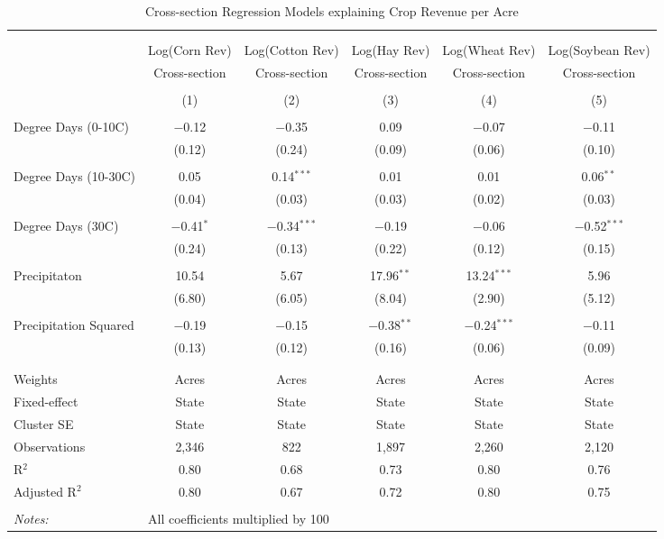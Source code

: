 \documentclass[10pt]{article}
\begin{document}
\begin{table}[!htbp] \centering 
  \caption{Cross-section Regression Models explaining Crop Revenue per Acre} 
  \label{} 
\footnotesize 
\begin{tabular}{@{\extracolsep{5pt}}lccccc} 
\\[-1.8ex]\hline 
\hline \\[-1.8ex] 
\\[-1.8ex] & Log(Corn Rev) & Log(Cotton Rev) & Log(Hay Rev) & Log(Wheat Rev) & Log(Soybean Rev) \\ 
 & Cross-section & Cross-section & Cross-section & Cross-section & Cross-section \\ 
\\[-1.8ex] & (1) & (2) & (3) & (4) & (5)\\ 
\hline \\[-1.8ex] 
 Degree Days (0-10C) & $-$0.12 & $-$0.35 & 0.09 & $-$0.07 & $-$0.11 \\ 
  & (0.12) & (0.24) & (0.09) & (0.06) & (0.10) \\ 
  & & & & & \\ 
 Degree Days (10-30C) & 0.05 & 0.14$^{***}$ & 0.01 & 0.01 & 0.06$^{**}$ \\ 
  & (0.04) & (0.03) & (0.03) & (0.02) & (0.03) \\ 
  & & & & & \\ 
 Degree Days (30C) & $-$0.41$^{*}$ & $-$0.34$^{***}$ & $-$0.19 & $-$0.06 & $-$0.52$^{***}$ \\ 
  & (0.24) & (0.13) & (0.22) & (0.12) & (0.15) \\ 
  & & & & & \\ 
 Precipitaton & 10.54 & 5.67 & 17.96$^{**}$ & 13.24$^{***}$ & 5.96 \\ 
  & (6.80) & (6.05) & (8.04) & (2.90) & (5.12) \\ 
  & & & & & \\ 
 Precipitation Squared & $-$0.19 & $-$0.15 & $-$0.38$^{**}$ & $-$0.24$^{***}$ & $-$0.11 \\ 
  & (0.13) & (0.12) & (0.16) & (0.06) & (0.09) \\ 
  & & & & & \\ 
\hline \\[-1.8ex] 
Weights & Acres & Acres & Acres & Acres & Acres \\ 
Fixed-effect & State & State & State & State & State \\ 
Cluster SE & State & State & State & State & State \\ 
Observations & 2,346 & 822 & 1,897 & 2,260 & 2,120 \\ 
R$^{2}$ & 0.80 & 0.68 & 0.73 & 0.80 & 0.76 \\ 
Adjusted R$^{2}$ & 0.80 & 0.67 & 0.72 & 0.80 & 0.75 \\ 
\hline 
\hline \\[-1.8ex] 
\textit{Notes:} & \multicolumn{5}{l}{All coefficients multiplied by 100} \\ 
\end{tabular} 
\end{table} 
\end{document}

